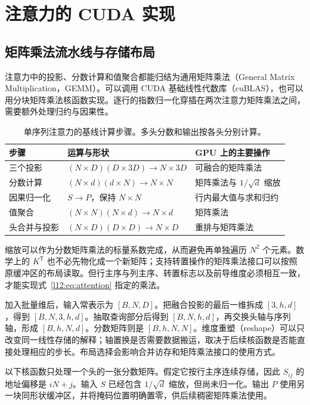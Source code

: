 \section{注意力的 CUDA 实现}
\label{l12:sec:cuda}

\subsection{矩阵乘法流水线与存储布局}

注意力中的投影、分数计算和值聚合都能归结为通用矩阵乘法（General Matrix Multiplication，GEMM）。可以调用 CUDA 基础线性代数库（cuBLAS），也可以用分块矩阵乘法核函数实现。逐行的指数归一化穿插在两次注意力矩阵乘法之间，需要额外处理归约与因果性。

\begin{table}[htbp]
\centering
\caption{单序列注意力的基线计算步骤。多头分数和输出按各头分别计算。}
\label{l12:tab:pipeline}
\begin{tabularx}{\linewidth}{@{}L{2.4cm}L{6.5cm}Y@{}}
\toprule
步骤 & 运算与形状 & GPU 上的主要操作\\
\midrule
三个投影 & $(N\times D)(D\times3D)\to N\times3D$ & 可融合的矩阵乘法\\
分数计算 & $(N\times d)(d\times N)\to N\times N$ & 矩阵乘法与 $1/\sqrt d$ 缩放\\
因果归一化 & $S\to P$，保持 $N\times N$ & 行内最大值与求和归约\\
值聚合 & $(N\times N)(N\times d)\to N\times d$ & 矩阵乘法\\
头合并与投影 & $(N\times D)(D\times D)\to N\times D$ & 重排与矩阵乘法\\
\bottomrule
\end{tabularx}
\end{table}

缩放可以作为分数矩阵乘法的标量系数完成，从而避免再单独遍历 $N^2$ 个元素。数学上的 $K^{\mathsf T}$ 也不必先物化成一个新矩阵；支持转置操作的矩阵乘法接口可以按照原缓冲区的布局读取。但行主序与列主序、转置标志以及前导维度必须相互一致，才能实现式~\eqref{l12:eq:attention} 指定的乘法。

加入批量维后，输入常表示为 $[B,N,D]$。把融合投影的最后一维拆成 $[3,h,d]$，得到 $[B,N,3,h,d]$。抽取查询部分后得到 $[B,N,h,d]$，再交换头轴与序列轴，形成 $[B,h,N,d]$。分数矩阵则是 $[B,h,N,N]$。维度重塑（reshape）可以只改变同一线性存储的解释；轴置换是否需要数据搬运，取决于后续核函数是否能直接处理相应的步长。布局选择会影响合并访存和矩阵乘法接口的使用方式。

以下核函数只处理一个头的一张分数矩阵。假定它按行主序连续存储，因此 $S_{ij}$ 的地址偏移是 $iN+j$。输入 $S$ 已经包含 $1/\sqrt d$ 缩放，但尚未归一化。输出 $P$ 使用另一块同形状缓冲区，并将掩码位置明确置零，供后续稠密矩阵乘法使用。

